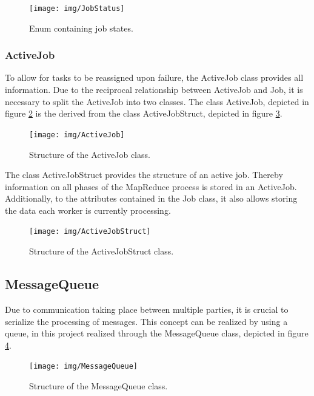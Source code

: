 \documentclass[12pt, letterpaper]{article}
\begin{document}
\begin{figure}[h]
	\centering
	\texttt{[image: img/JobStatus]}
	\caption{Enum containing job states.}
	\label{fig:classes_JobStatus}
\end{figure}

\subsubsection{ActiveJob}

To allow for tasks to be reassigned upon failure, the ActiveJob class provides all information.
Due to the reciprocal relationship between ActiveJob and Job, it is necessary to split the ActiveJob into two classes. The class ActiveJob, depicted in figure \ref{fig:classes_ActiveJob} is the derived from the class ActiveJobStruct, depicted in figure \ref{fig:classes_ActiveJobStruct}.

\begin{figure}[h]
	\centering
	\texttt{[image: img/ActiveJob]}
	\caption{Structure of the ActiveJob class.}
	\label{fig:classes_ActiveJob}
\end{figure}

The class ActiveJobStruct provides the structure of an active job. Thereby information on all phases of the MapReduce process is stored in an ActiveJob. Additionally, to the attributes contained in the Job class, it also allows storing the data each worker is currently processing.

\begin{figure}[h]
	\centering
	\texttt{[image: img/ActiveJobStruct]}
	\caption{Structure of the ActiveJobStruct class.}
	\label{fig:classes_ActiveJobStruct}
\end{figure}
\pagebreak

\subsection{MessageQueue}

Due to communication taking place between multiple parties, it is crucial to serialize the processing of messages. This concept can be realized by using a queue, in this project realized through the MessageQueue class, depicted in figure \ref{fig:classes_MessageQueue}.

\begin{figure}[h]
	\centering
	\texttt{[image: img/MessageQueue]}
	\caption{Structure of the MessageQueue class.}
	\label{fig:classes_MessageQueue}
\end{figure}
\end{document}
